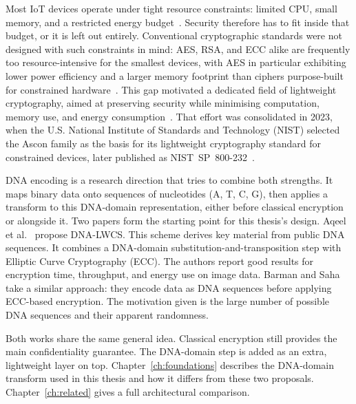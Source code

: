 \documentclass[12pt,a4paper,twoside]{report}
\numberwithin{equation}{chapter}
\begin{document}
Most IoT devices operate under tight resource constraints: limited CPU,
small memory, and a restricted energy budget~\cite{zinabu2025}. Security
therefore has to fit inside that budget, or it is left out entirely.
Conventional cryptographic standards
were not designed with such constraints in mind: AES, RSA, and ECC alike
are frequently too resource-intensive for the smallest devices, with AES
in particular exhibiting lower power efficiency and a larger memory
footprint than ciphers purpose-built for constrained
hardware~\cite{zinabu2025}. This gap motivated a dedicated field of
lightweight cryptography, aimed at preserving security while minimising
computation, memory use, and energy
consumption~\cite{thakor2021}. That effort was consolidated in 2023, when
the U.S. National Institute of Standards and Technology (NIST) selected
the Ascon family as the basis for its lightweight cryptography standard
for constrained devices, later published as NIST~SP~800-232~\cite{nist800232}.

DNA encoding is a research direction that tries to combine both
strengths. It maps binary data onto sequences of nucleotides (A, T, C,
G), then applies a transform to this DNA-domain representation, either
before classical encryption or alongside it. Two papers form the
starting point for this thesis's design. Aqeel et al.~\cite{aqeel2025}
propose DNA-LWCS. This scheme derives key material from public DNA
sequences. It combines a DNA-domain substitution-and-transposition step
with Elliptic Curve Cryptography (ECC). The authors report good results
for encryption time, throughput, and energy use on image data.
Barman and Saha~\cite{dnaecc} take a similar approach: they encode data
as DNA sequences before applying ECC-based encryption. The motivation
given is the large number of possible DNA sequences and their apparent
randomness.

Both works share the same general idea. Classical encryption still
provides the main confidentiality guarantee. The DNA-domain step is
added as an extra, lightweight layer on top. Chapter~\ref{ch:foundations}
describes the DNA-domain transform used in this thesis and how it
differs from these two proposals. Chapter~\ref{ch:related} gives a full
architectural comparison.
\end{document}
